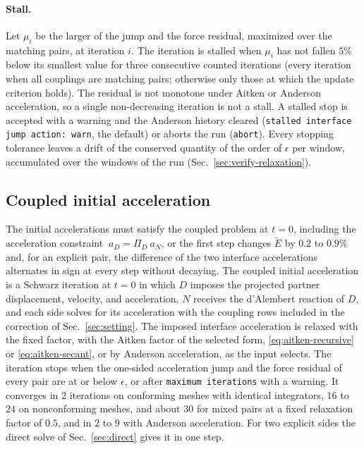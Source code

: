 \documentclass[11pt]{article}
\newcommand{\code}[1]{\texttt{#1}}
\begin{document}
\paragraph{Stall.} Let $\mu_i$ be the larger of the jump and the force
residual, maximized over the matching pairs, at iteration $i$. The
iteration is stalled when $\mu_i$ has not fallen $5\%$ below its smallest
value for three consecutive counted iterations (every iteration when all
couplings are matching pairs; otherwise only those at which the
update criterion holds). The residual is not monotone under
Aitken or Anderson acceleration, so a single non-decreasing iteration is
not a stall. A stalled stop is accepted with a warning and the Anderson
history cleared (\code{stalled interface jump action: warn}, the default)
or aborts the run (\code{abort}). Every stopping tolerance leaves a drift
of the conserved quantity of the order of $\epsilon$ per window,
accumulated over the windows of the run (Sec.~\ref{sec:verify-relaxation}).

\subsection{Coupled initial acceleration}
\label{sec:initial}

The initial accelerations must satisfy the coupled problem at $t = 0$,
including the acceleration constraint $~a_D = \Pi_D ~a_N$, or the first
step changes $\tilde{E}$ by $0.2$ to $0.9\%$ and, for an explicit pair, the
difference of the two interface accelerations alternates in sign at every
step without decaying. The coupled initial acceleration is a Schwarz
iteration at $t = 0$ in which $D$ imposes the projected partner
displacement, velocity, and acceleration, $N$ receives the d'Alembert
reaction of $D$, and each side solves for its acceleration with the
coupling rows included in the correction of Sec.~\ref{sec:setting}. The
imposed interface acceleration is relaxed with
the fixed factor, with the Aitken factor of the selected form,
\eqref{eq:aitken-recursive} or \eqref{eq:aitken-secant}, or by Anderson
acceleration, as the input selects. The iteration stops when the one-sided acceleration jump and the
force residual of every pair are at or below $\epsilon$, or after
\code{maximum iterations} with a warning. It converges in $2$ iterations
on conforming meshes with identical integrators, $16$ to $24$ on
nonconforming meshes, and about $30$ for mixed pairs at a fixed
relaxation factor of $0.5$, and in $2$ to $9$ with Anderson acceleration.
For two explicit sides the direct solve of Sec.~\ref{sec:direct} gives it
in one step.
\end{document}
